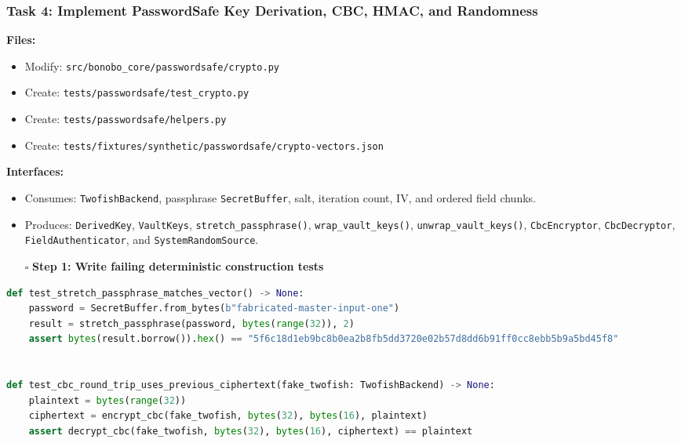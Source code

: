 \documentclass[
  letterpaper,
]{article}
\newcommand{\passthrough}[1]{#1}
\providecommand{\tightlist}{%
  \setlength{\itemsep}{0pt}\setlength{\parskip}{0pt}}
\begin{document}
\subsubsection{Task 4: Implement PasswordSafe Key Derivation, CBC, HMAC, and
Randomness}\label{task-4-implement-passwordsafe-key-derivation-cbc-hmac-and-randomness}

\textbf{Files:}

\begin{itemize}
\tightlist
\item
  Modify: \nolinkurl{src/bonobo_core/passwordsafe/crypto.py}
\item
  Create: \nolinkurl{tests/passwordsafe/test_crypto.py}
\item
  Create: \nolinkurl{tests/passwordsafe/helpers.py}
\item
  Create: \nolinkurl{tests/fixtures/synthetic/passwordsafe/crypto-vectors.json}
\end{itemize}

\textbf{Interfaces:}

\begin{itemize}
\tightlist
\item
  Consumes: \nolinkurl{TwofishBackend}, passphrase \nolinkurl{SecretBuffer}, salt, iteration count, IV, and ordered
  field chunks.
\item
  Produces: \nolinkurl{DerivedKey}, \passthrough{\lstinline!VaultKeys!}, \nolinkurl{stretch_passphrase()},
  \nolinkurl{wrap_vault_keys()}, \nolinkurl{unwrap_vault_keys()}, \nolinkurl{CbcEncryptor}, \nolinkurl{CbcDecryptor},
  \nolinkurl{FieldAuthenticator}, and \nolinkurl{SystemRandomSource}.
\end{itemize}

\begin{itemize}
\tightlist
\item[$\square$]
  \textbf{Step 1: Write failing deterministic construction tests}
\end{itemize}

\begin{lstlisting}[language=Python]
def test_stretch_passphrase_matches_vector() -> None:
    password = SecretBuffer.from_bytes(b"fabricated-master-input-one")
    result = stretch_passphrase(password, bytes(range(32)), 2)
    assert bytes(result.borrow()).hex() == "5f6c18d1eb9bc8b0ea2b8fb5dd3720e02b57d8dd6b91ff0cc8ebb5b9a5bd45f8"


def test_cbc_round_trip_uses_previous_ciphertext(fake_twofish: TwofishBackend) -> None:
    plaintext = bytes(range(32))
    ciphertext = encrypt_cbc(fake_twofish, bytes(32), bytes(16), plaintext)
    assert decrypt_cbc(fake_twofish, bytes(32), bytes(16), ciphertext) == plaintext
\end{lstlisting}
\end{document}
